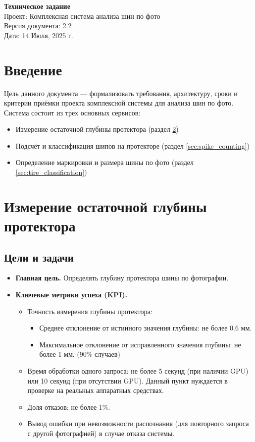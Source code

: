 \documentclass[12pt]{article}
\begin{document}
\begin{center}
	{\LARGE \textbf{Техническое задание}}\\[1em]
	{\Large Проект: Комплексная система анализа шин по фото}\\[2em]
	Версия документа: 2.2 \\
	Дата: 14 Июля, 2025 г.
\end{center}

\tableofcontents
\newpage

\section{Введение}
Цель данного документа — формализовать требования, архитектуру, сроки и критерии приёмки проекта комплексной системы для анализа шин по фото. Система состоит из трех основных сервисов:
\begin{itemize}
	\item Измерение остаточной глубины протектора (раздел \ref{sec:depth_measurement})
	\item Подсчёт и классификация шипов на протекторе (раздел \ref{sec:spike_counting})
	\item Определение маркировки и размера шины по фото (раздел \ref{sec:tire_classification})
\end{itemize}

\section{Измерение остаточной глубины протектора}
\label{sec:depth_measurement}

\subsection{Цели и задачи}
\begin{itemize}
	\item \textbf{Главная цель.} Определять глубину протектора шины по фотографии.
	\item \textbf{Ключевые метрики успеха (KPI).}
	      \begin{itemize}
		      \item Точность измерения глубины протектора:
		            \begin{itemize}
			            \item Среднее отклонение от истинного значения глубины: не более 0.6 мм.
			            \item Максимальное отклонение от исправленного значения глубины: не более 1 мм. (90\% случаев)
		            \end{itemize}
		      \item Время обработки одного запроса: не более 5 секунд (при наличии GPU) или 10 секунд (при отсутствии GPU). Данный пункт нуждается в проверке на реальных аппаратных средствах.
		      \item Доля отказов: не более 1\%.
		      \item Вывод ошибки при невозможности распознания (для повторного запроса с другой фотографией) в случае отказа системы.
	      \end{itemize}
\end{itemize}
\end{document}
